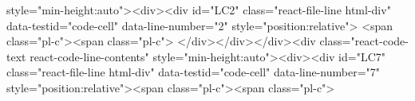 {{{{{{{{{{{{{{{{{{{{{{{{{{{{{{{style="min-height:auto"><div><div id="LC2" class="react-file-line html-div" data-testid="code-cell" data-line-number="2" style="position:relative">  <span class="pl-c"><span class="pl-c">%
</div></div></div><div class="react-code-text react-code-line-contents" style="min-height:auto"><div><div id="LC7" class="react-file-line html-div" data-testid="code-cell" data-line-number="7" style="position:relative"><span class="pl-c"><span class="pl-c">%
}}}}}}}}}}}}}}}}}}}}}}}}}}}}}}}
